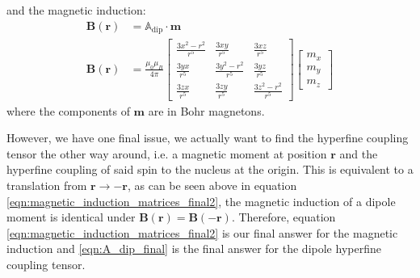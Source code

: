 \documentclass[12pt]{article}
\begin{document}
and the magnetic induction:
\begin{align}
\label{eqn:magnetic_induction_matrices_final1}
\mathbf{B}({\mathbf{r}}) &= \mathbb{A}_\mathrm{dip} \cdot \mathbf{m} \\
\label{eqn:magnetic_induction_matrices_final2}
\mathbf{B}({\mathbf{r}}) &= \frac{\mu_0 \mu_B}{4\pi}
	\begin{bmatrix} 
		\frac{3x^2 - r^2}{r^5} & \frac{3xy}{r^5}        & \frac{3xz}{r^5}        \\ 
		\frac{3yx}{r^5}        & \frac{3y^2 - r^2}{r^5} & \frac{3yz}{r^5}        \\ 
		\frac{3zx}{r^5}        & \frac{3zy}{r^5}        & \frac{3z^2 - r^2}{r^5}
	\end{bmatrix}
\begin{bmatrix}
m_x \\
m_y \\
m_z
\end{bmatrix}
\end{align}
where the components of $\mathbf{m}$ are in Bohr magnetons.

However, we have one final issue, we actually want to find the hyperfine coupling tensor the other way around, i.e. a magnetic moment at position $\mathbf{r}$ and the hyperfine coupling of said spin to the nucleus at the origin. This is equivalent to a translation from $\mathbf{r} \rightarrow -\mathbf{r}$, as can be seen above in equation \ref{eqn:magnetic_induction_matrices_final2}, the magnetic induction of a dipole moment is identical under $\mathbf{B}({\mathbf{r}}) = \mathbf{B}({\mathbf{-r}})$. Therefore, equation \ref{eqn:magnetic_induction_matrices_final2} is our final answer for the magnetic induction and \ref{eqn:A_dip_final} is the final answer for the dipole hyperfine coupling tensor. 
%
%
\end{document}
